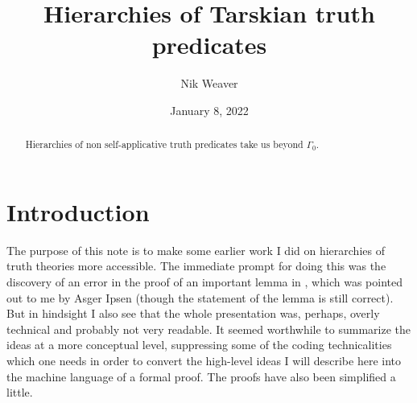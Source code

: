 \documentclass{amsart}
\begin{document}
\newtheorem{theo}{Theorem}[section]
\newtheorem{atheo}{Theorem*}
\newtheorem{prop}[theo]{Proposition}
\newtheorem{aprop}[atheo]{Proposition*}
\newtheorem{lemma}[theo]{Lemma}
\newtheorem{alemma}[atheo]{Lemma*}
\newtheorem{exam}[theo]{Example}
\newtheorem{coro}[theo]{Corollary}
\theoremstyle{definition}
\newtheorem{defi}[theo]{Definition}
\newtheorem{rem}[theo]{Remark}

\title[Tarskian truth hierarchies]
{Hierarchies of Tarskian truth predicates}
\author{Nik Weaver}
\address{Department of Mathematics, Washington University in St. Louis}
\date{January 8, 2022}



\begin{abstract}
Hierarchies of non self-applicative truth predicates take us beyond $\Gamma_0$.
\end{abstract}

\maketitle

\section{Introduction}

The purpose of this note is to make some earlier work I did on hierarchies of truth theories
\cite{weaver} more accessible. The immediate prompt for doing this was the discovery of an
error in the proof of an important lemma in \cite{weaver}, which was pointed out to me by
Asger Ipsen \cite{ipsen} (though the statement of the lemma is still correct). But in hindsight
I also see that the whole presentation was, perhaps, overly technical and probably not very readable.
It seemed worthwhile to summarize the ideas at a more conceptual level, suppressing some of the
coding technicalities which one needs in order to convert the high-level ideas I will describe
here into the machine language of a formal proof. The proofs have also been simplified a little.
\end{document}
